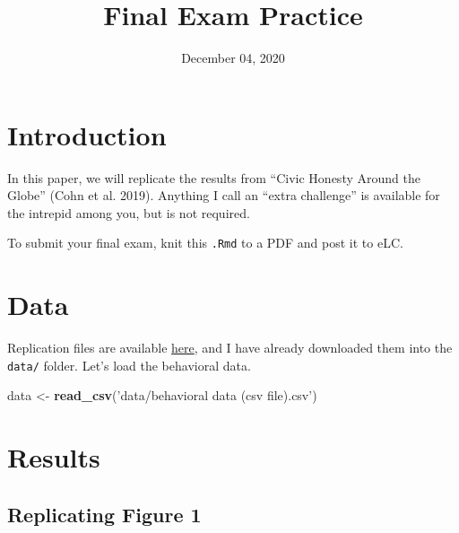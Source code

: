 \documentclass[12pt,halfline,a4paper,]{ouparticle}
\newenvironment{Shaded}{\begin{snugshade}}{\end{snugshade}}
\newcommand{\KeywordTok}[1]{\textcolor[rgb]{0.13,0.29,0.53}{\textbf{#1}}}
\newcommand{\NormalTok}[1]{#1}
\newcommand{\StringTok}[1]{\textcolor[rgb]{0.31,0.60,0.02}{#1}}
\begin{document}
\title{Final Exam Practice}

\author{%
\address{University of Georgia}
\and
{}\address{University of Georgia}
}

\abstract{}

\date{December 04, 2020}

\keywords{}

\maketitle



\hypertarget{introduction}{%
\section{Introduction}\label{introduction}}

In this paper, we will replicate the results from ``Civic Honesty Around
the Globe'' (Cohn et al. 2019). Anything I call an ``extra challenge''
is available for the intrepid among you, but is not required.

To submit your final exam, knit this \texttt{.Rmd} to a PDF and post it
to eLC.

\hypertarget{data}{%
\section{Data}\label{data}}

Replication files are available
\href{https://dataverse.harvard.edu/dataverse/honesty}{here}, and I have
already downloaded them into the \texttt{data/} folder. Let's load the
behavioral data.

\begin{Shaded}
\begin{Highlighting}[]
\NormalTok{data <-}\StringTok{ }\KeywordTok{read_csv}\NormalTok{(}\StringTok{'data/behavioral data (csv file).csv'}\NormalTok{)}
\end{Highlighting}
\end{Shaded}

\hypertarget{results}{%
\section{Results}\label{results}}

\hypertarget{replicating-figure-1}{%
\subsection{Replicating Figure 1}\label{replicating-figure-1}}
\end{document}
